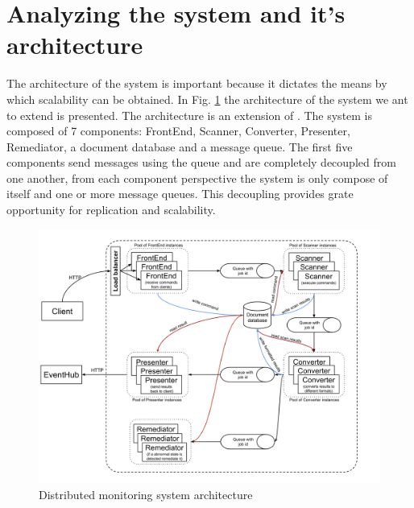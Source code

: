 \section{Analyzing the system and it's architecture}
The architecture of the system is important because it dictates the means by which scalability can be obtained. In Fig. \ref{fig:systemArchitecture} the architecture of the system we ant to extend is presented. The architecture is an extension of \cite{IrimieAndPetcu}. The system is composed of 7 components: FrontEnd, Scanner, Converter, Presenter, Remediator, a document database and a message queue. The first five components send messages using the queue and are completely decoupled from one another, from each component perspective the system is only compose of itself and one or more message queues. This decoupling provides grate opportunity for replication and scalability.

\begin{figure}[ht]
\centering
\includegraphics[width=\linewidth]{./img/MonitoringSystemArchitectureRemediation.png}
\caption{Distributed monitoring system architecture}
\label{fig:systemArchitecture}
\end{figure}

